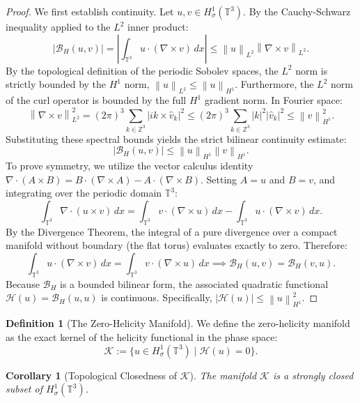 \documentclass[12pt,a4paper]{article}
\theoremstyle{plain}
\newtheorem{corollary}[theorem]{Corollary}
\theoremstyle{definition}
\newtheorem{definition}[theorem]{Definition}
\theoremstyle{remark}
\newcommand{\T}{\mathbb{T}}
\newcommand{\Z}{\mathbb{Z}}
\newcommand{\norm}[1]{\left\|#1\right\|}
\begin{document}
\begin{proof}
We first establish continuity. Let $u, v \in H^1_\sigma(\T^3)$. By the Cauchy-Schwarz inequality applied to the $L^2$ inner product:
\[
  |\mathcal{B}_H(u, v)| = \left| \int_{\T^3} u \cdot (\nabla \times v) \,dx \right| \le \norm{u}_{L^2} \norm{\nabla \times v}_{L^2}.
\]
By the topological definition of the periodic Sobolev spaces, the $L^2$ norm is strictly bounded by the $H^1$ norm, $\norm{u}_{L^2} \le \norm{u}_{H^1}$. Furthermore, the $L^2$ norm of the curl operator is bounded by the full $H^1$ gradient norm. In Fourier space:
\[
  \norm{\nabla \times v}_{L^2}^2 = (2\pi)^3 \sum_{k \in \Z^3} |i k \times \hat{v}_k|^2 \le (2\pi)^3 \sum_{k \in \Z^3} |k|^2 |\hat{v}_k|^2 \le \norm{v}_{H^1}^2.
\]
Substituting these spectral bounds yields the strict bilinear continuity estimate:
\begin{equation}
  |\mathcal{B}_H(u, v)| \le \norm{u}_{H^1} \norm{v}_{H^1}. \label{eq:bilinear_bound}
\end{equation}
To prove symmetry, we utilize the vector calculus identity $\nabla \cdot (A \times B) = B \cdot (\nabla \times A) - A \cdot (\nabla \times B)$. Setting $A = u$ and $B = v$, and integrating over the periodic domain $\T^3$:
\[
  \int_{\T^3} \nabla \cdot (u \times v) \,dx = \int_{\T^3} v \cdot (\nabla \times u) \,dx - \int_{\T^3} u \cdot (\nabla \times v) \,dx.
\]
By the Divergence Theorem, the integral of a pure divergence over a compact manifold without boundary (the flat torus) evaluates exactly to zero. Therefore:
\[
  \int_{\T^3} u \cdot (\nabla \times v) \,dx = \int_{\T^3} v \cdot (\nabla \times u) \,dx \implies \mathcal{B}_H(u, v) = \mathcal{B}_H(v, u).
\]
Because $\mathcal{B}_H$ is a bounded bilinear form, the associated quadratic functional $\mathcal{H}(u) = \mathcal{B}_H(u,u)$ is continuous. Specifically, $|\mathcal{H}(u)| \le \norm{u}_{H^1}^2$.
\end{proof}

\begin{definition}[The Zero-Helicity Manifold]
\label{def:zero_manifold}
We define the zero-helicity manifold as the exact kernel of the helicity functional in the phase space:
\[
  \mathcal{K} := \big\{ u \in H^1_\sigma(\T^3) \;\big|\; \mathcal{H}(u) = 0 \big\}.
\]
\end{definition}

\begin{corollary}[Topological Closedness of $\mathcal{K}$]
\label{cor:closed_manifold}
The manifold $\mathcal{K}$ is a strongly closed subset of $H^1_\sigma(\T^3)$.
\end{corollary}
\end{document}
